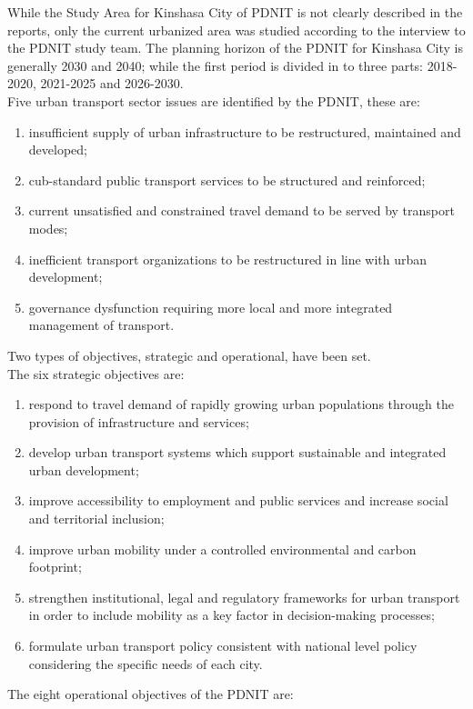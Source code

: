 \documentclass{article}
\begin{document}
While the Study Area for Kinshasa City of PDNIT is not clearly described in the reports, only the 
current urbanized area was studied according to the interview to the PDNIT study team. The planning horizon of the PDNIT for Kinshasa City is generally 2030 and 2040; while the first period is divided in to three parts: 2018-2020, 2021-2025 and 2026-2030.\\
Five urban transport sector issues are identified by the PDNIT, these are: 
\begin{enumerate}
\item insufficient supply of urban infrastructure to be restructured, maintained and developed; 
\item cub-standard public transport services to be structured and reinforced; 
\item current unsatisfied and constrained travel demand to be served by transport modes; 
\item inefficient transport organizations to be restructured in line with urban development; 
\item governance dysfunction requiring more local and more integrated management of transport. 
\end{enumerate}
Two types of objectives, strategic and operational, have been set.\\
The six strategic objectives are: 
\begin{enumerate}
\item respond to travel demand of rapidly growing urban populations through the provision of infrastructure and services;
\item develop urban transport systems which support sustainable and integrated urban development; 
\item improve accessibility to employment and public services and increase social and territorial inclusion; 
\item improve urban mobility under a controlled environmental and carbon footprint; 
\item strengthen institutional, legal and regulatory frameworks for urban transport in order to include mobility as a key factor in decision-making processes; 
\item formulate urban transport policy consistent with national level policy considering the specific needs of each city. \end{enumerate}
The eight operational objectives of the PDNIT are: 
\end{document}
